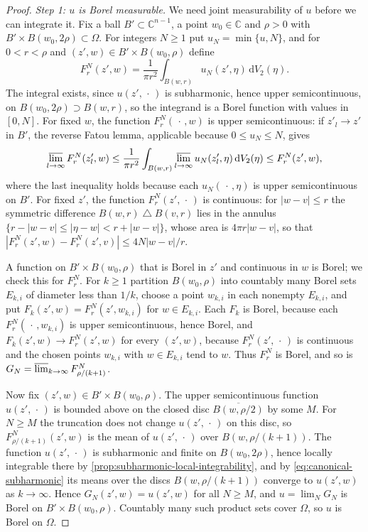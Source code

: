 \begin{proof}
\emph{Step 1: $u$ is Borel measurable.} We need joint measurability of $u$ before we can integrate it. Fix a ball $B'\subset\mathbb{C}^{n-1}$, a point $w_0\in\mathbb{C}$ and $\rho>0$ with $B'\times B(w_0,2\rho)\subset\Omega$. For integers $N\ge1$ put $u_N=\min\{u,N\}$, and for $0<r<\rho$ and $(z',w)\in B'\times B(w_0,\rho)$ define
\[
 F_r^N(z',w)=\frac{1}{\pi r^2}\int_{B(w,r)}u_N(z',\eta)\,\mathrm{d}V_2(\eta).
\]
The integral exists, since $u(z',\,\cdot\,)$ is subharmonic, hence upper semicontinuous, on $B(w_0,2\rho)\supset B(w,r)$, so the integrand is a Borel function with values in $[0,N]$. For fixed $w$, the function $F_r^N(\,\cdot\,,w)$ is upper semicontinuous: if $z'_l\to z'$ in $B'$, the reverse Fatou lemma, applicable because $0\le u_N\le N$, gives
\[
 \varlimsup_{l\to\infty}F_r^N(z'_l,w)
 \le\frac{1}{\pi r^2}\int_{B(w,r)}\varlimsup_{l\to\infty}u_N(z'_l,\eta)\,\mathrm{d}V_2(\eta)
 \le F_r^N(z',w),
\]
where the last inequality holds because each $u_N(\,\cdot\,,\eta)$ is upper semicontinuous on $B'$. For fixed $z'$, the function $F_r^N(z',\,\cdot\,)$ is continuous: for $|w-v|\leq r$ the symmetric difference $B(w,r)\mathbin\triangle B(v,r)$ lies in the annulus $\{r-|w-v|\leq|\eta-w|<r+|w-v|\}$, whose area is $4\pi r|w-v|$, so that $|F_r^N(z',w)-F_r^N(z',v)|\le4N|w-v|/r$.

A function on $B'\times B(w_0,\rho)$ that is Borel in $z'$ and continuous in $w$ is Borel; we check this for $F_r^N$. For $k\geq1$ partition $B(w_0,\rho)$ into countably many Borel sets $E_{k,i}$ of diameter less than $1/k$, choose a point $w_{k,i}$ in each nonempty $E_{k,i}$, and put $F_k(z',w)=F_r^N(z',w_{k,i})$ for $w\in E_{k,i}$. Each $F_k$ is Borel, because each $F_r^N(\,\cdot\,,w_{k,i})$ is upper semicontinuous, hence Borel, and $F_k(z',w)\to F_r^N(z',w)$ for every $(z',w)$, because $F_r^N(z',\,\cdot\,)$ is continuous and the chosen points $w_{k,i}$ with $w\in E_{k,i}$ tend to $w$. Thus $F_r^N$ is Borel, and so is $G_N=\varlimsup_{k\to\infty}F^N_{\rho/(k+1)}$.

Now fix $(z',w)\in B'\times B(w_0,\rho)$. The upper semicontinuous function $u(z',\,\cdot\,)$ is bounded above on the closed disc $\overline{B(w,\rho/2)}$ by some $M$. For $N\geq M$ the truncation does not change $u(z',\,\cdot\,)$ on this disc, so $F^N_{\rho/(k+1)}(z',w)$ is the mean of $u(z',\,\cdot\,)$ over $B(w,\rho/(k+1))$. The function $u(z',\,\cdot\,)$ is subharmonic and finite on $B(w_0,2\rho)$, hence locally integrable there by \cref{prop:subharmonic-local-integrability}, and by \eqref{eq:canonical-subharmonic} its means over the discs $B(w,\rho/(k+1))$ converge to $u(z',w)$ as $k\to\infty$. Hence $G_N(z',w)=u(z',w)$ for all $N\geq M$, and $u=\lim_NG_N$ is Borel on $B'\times B(w_0,\rho)$. Countably many such product sets cover $\Omega$, so $u$ is Borel on $\Omega$.


\end{proof}
